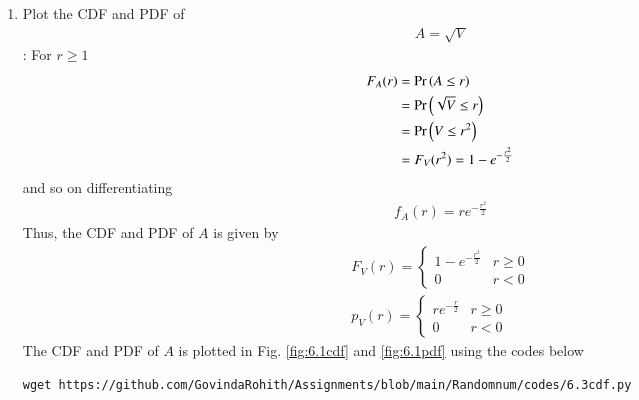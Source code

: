 \documentclass[journal,12pt,twocolumn]{IEEEtran}
\renewcommand\thesection{\arabic{section}}
\begin{document}
\begin{enumerate}[label=\thesection.\arabic*
,ref=\thesection.\theenumi]
\begin{enumerate}[label=\thesection.\arabic*
,ref=\thesection.\theenumi]
		\begin{align}
		    F_V(r)=F_{X_1^2+X_2^2}(r)\\
		    \implies F_V(r)=F_{R^2}(r)\\
		    \implies F_V(r)=\Pr{(R^2\le x)}\\
		    \implies F_V(r)=\Pr{(R\le \sqrt{x})}\\
		    \text{But }F_V(x)=\Pr{(R\le x)}\\
		    \implies F_V(x)=\int _{0}^{x}f_R(r)dr\\
F_V(x)&=1-e^{\frac{-x^2}{2}}\\
\implies F_V(r)=\begin{cases}
0 & r<0\\
1-e^{\frac{-r}{2}} &r\ge 0\\
\end{cases}
		\end{align}
		\begin{align}
		    \implies \boxed{\alpha=\frac{1}{2}}
		\end{align}
\item Plot the CDF and PDF of 
\begin{align}
    A=\sqrt{V}
\end{align}
\solution: For $r\ge 1$
\begin{align}
	F_A(r) &= \Pr\left(A \leq r\right) \\
	&= \Pr\left(\sqrt{V} \leq r\right) \\
	&= \Pr\left(V \leq r^2\right) \\
	&= F_V(r^2) = 1 - e^{-\frac{r^2}{2}}
\end{align}
and so on differentiating 
\begin{align}
	f_A(r) = re^{-\frac{r^2}{2}}
\end{align}
Thus, the CDF and PDF of $A$ is given by
\begin{align}
	F_V(r) = 
	\begin{cases}
		1 - e^{-\frac{r^2}{2}} & r \geq 0 \\
		0 & r < 0 
	\end{cases} \label{eq:ral-cdf} \\
	p_V(r) = 
	\begin{cases}
		re^{-\frac{r}{2}} & r \geq 0 \\
		0 & r < 0
	\end{cases} \label{eq:ral-pdf} 
\end{align}
The CDF and PDF of $A$ is plotted in Fig. \ref{fig:6.1cdf} and \ref{fig:6.1pdf} using the codes below
\begin{lstlisting}
wget https://github.com/GovindaRohith/Assignments/blob/main/Randomnum/codes/6.3cdf.py

\end{lstlisting}
\end{enumerate}
\end{enumerate}
\end{document}
